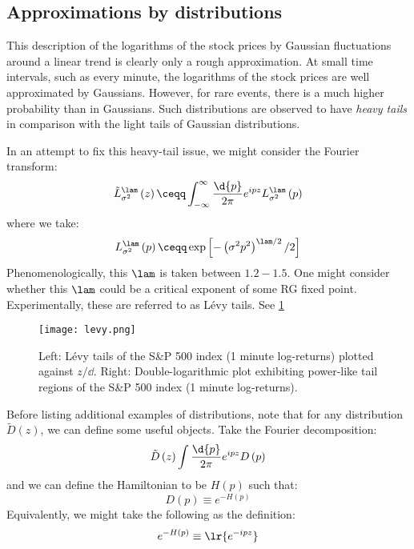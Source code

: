 \documentclass{booc}
\begin{document}
\subsection{Approximations by distributions}

This description of the logarithms of the stock prices by Gaussian fluctuations around a linear
trend is clearly only a rough approximation. 
At small time intervals, such as every minute, the logarithms of the stock prices
are well approximated by Gaussians.
However, for rare events, there is a much higher probability than in Gaussians. 
Such distributions are observed to have \emph{heavy tails} in comparison with
the light tails of Gaussian distributions. 

\begin{exm}
In an attempt to fix this heavy-tail issue, we might 
consider the Fourier transform:
\begin{equation}
\tilde L_{\sigma^2}^\lam\left( z \right)
\ceqq \int_{-\infty}^\infty \frac{\d{p}}{2\pi}
e^{ipz} L_{\sigma^2}^\lam \left( p \right)
\end{equation}
where we take:
\begin{equation}
L_{\sigma^2}^\lam \left( p \right)\ceqq
\exp\left[ -\left( \sigma^2 p^2  \right)^{\lam / 2} / 2 \right]
\end{equation}
Phenomenologically, this $\lam$ is taken between $1.2-1.5$.
One might consider whether this $\lam$ could be a critical exponent of some RG fixed point. 
Experimentally, these are referred to as L\'evy tails. See \cref{fig:levy}
\begin{figure}
\centering
\texttt{[image: levy.png]}
\caption{Left: L\'evy tails of the S\&P 500 index (1 minute log-returns) plotted
against $z / \dd$. 
Right: Double-logarithmic plot exhibiting power-like tail regions of the S\&P
500 index (1 minute log-returns).}
\label{fig:levy}
\end{figure}
\end{exm}

Before listing additional examples of distributions, note that
for any distribution $\tilde D\left( z \right)$, we can define some useful objects.
Take the Fourier decomposition:
\begin{equation}
\tilde D\left( z \right) \int \frac{\d{p}}{2\pi}
e^{ipz} D\left( p \right)
\end{equation}
and we can define the Hamiltonian to be $H\left( p \right)$ such that:
\begin{equation}
D\left( p \right) \equiv e^{-H\left( p \right)}
\end{equation}
Equivalently, we might take the following as the definition:
\begin{equation}
e^{-H\left( p \right)} \equiv
\lr{e^{-ipz}}
\end{equation}
\end{document}
